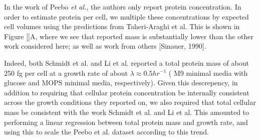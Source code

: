 \documentclass[11pt]{article}
\begin{document}
In the work of Peebo {\it et al.}, the authors only report protein concentration.
In  order to estimate protein per cell, we multiple  these concentrations by
expected cell volumes  using the predictions from  Taheri-Araghi et al. This is
shown in Figure \ref{}A, where we see that reported mass is substantially lower than
the other work considered here; as well as work from others [Sinauer, 1990].

Indeed, both Schmidt et al. and Li et al. reported a total protein mass of about
250 fg per cell at a growth rate of about $\lambda \approx 0.5 hr^{-1}$ ( M9
minimal media with glucose and MOPS minimal media, respectively). Given this
descrepency, in addition to requiring that cellular protein concentration be
internally consistent across the growth conditions they reported on, we also
required that total cellular mass be consistent with the work Schmidt et al. and
Li et al. This amounted to performing a linear regression between total protein
mass and growth rate, and using this to scale the Peebo et al. dataset according
to this trend. 



%
\end{document}
